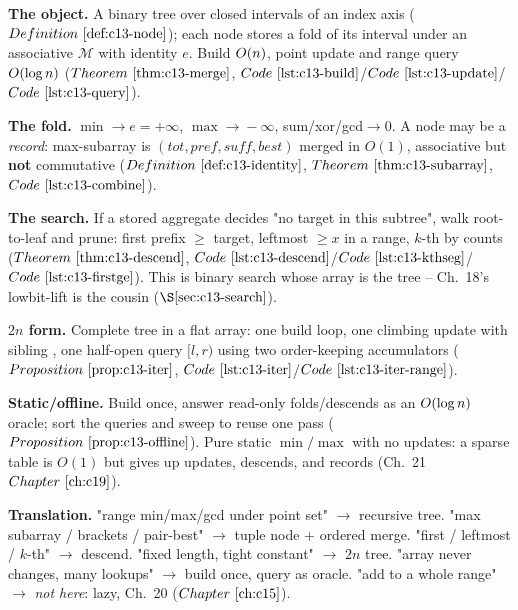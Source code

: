 \begin{quickref}
\textbf{The object.} A binary tree over closed intervals of an index axis
(\(\defref{c13-node}\)); each node stores a fold of its interval under an
associative \(\mathcal{M}\) with identity \(e\). Build \(O(n)\), point update
and range query \(O(\log n)\) (\(\thmref{c13-merge}\),
\(\coderef{c13-build}\)/\(\coderef{c13-update}\)/\(\coderef{c13-query}\)).

\medskip
\textbf{The fold.} \(\min\!\to\!e{=}{+}\infty\), \(\max\!\to\!{-}\infty\),
sum/xor/gcd\(\to0\). A node may be a \emph{record}: max-subarray is
\((\mathit{tot},\mathit{pref},\mathit{suff},\mathit{best})\) merged in \(O(1)\),
associative but \textbf{not} commutative (\(\defref{c13-identity}\),
\(\thmref{c13-subarray}\), \(\coderef{c13-combine}\)).

\medskip
\textbf{The search.} If a stored aggregate decides "no target in this subtree",
walk root-to-leaf and prune: first prefix \(\ge\) target, leftmost \(\ge x\) in a
range, \(k\)-th by counts (\(\thmref{c13-descend}\),
\(\coderef{c13-descend}\)/\(\coderef{c13-kthseg}\)/\(\coderef{c13-firstge}\)).
This is binary search whose array is the tree -- Ch.~18's lowbit-lift is the
cousin (\(\secref{c13-search}\)).

\medskip
\textbf{\(2n\) form.} Complete tree in a flat array: one build loop, one climbing
update  with sibling , one half-open query
\([l,r)\) using two order-keeping accumulators (\(\propref{c13-iter}\),
\(\coderef{c13-iter}\)/\(\coderef{c13-iter-range}\)).

\medskip
\textbf{Static/offline.} Build once, answer read-only folds/descends as an
\(O(\log n)\) oracle; sort the queries and sweep to reuse one pass
(\(\propref{c13-offline}\)). Pure static \(\min/\max\) with no updates: a sparse
table is \(O(1)\) but gives up updates, descends, and records (Ch.~21 \(\chref{c19}\)).

\medskip
\textbf{Translation.} "range min/max/gcd under point set" \(\to\) recursive tree.
"max subarray / brackets / pair-best" \(\to\) tuple node + ordered merge. "first /
leftmost / \(k\)-th" \(\to\) descend. "fixed length, tight constant" \(\to\) \(2n\)
tree. "array never changes, many lookups" \(\to\) build once, query as oracle.
"add to a whole range" \(\to\) \emph{not here}: lazy, Ch.~20 (\(\chref{c15}\)).
\end{quickref}

